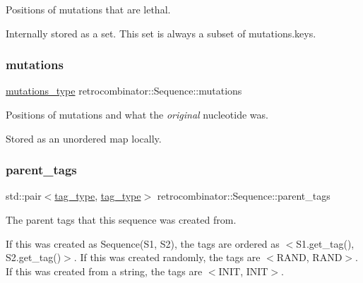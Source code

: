 Positions of mutations that are lethal. 

Internally stored as a set. This set is always a subset of {\ttfamily mutations.\+keys}. \mbox{\label{classretrocombinator_1_1Sequence_a07dd3101f7838d76300313ecfb97f3fc}} 
\subsubsection{\texorpdfstring{mutations}{mutations}}
{\footnotesize\ttfamily \hyperlink{classretrocombinator_1_1Sequence_a2abbaf2376f035a997e02c4afae9f476}{mutations\+\_\+type} retrocombinator\+::\+Sequence\+::mutations\hspace{0.3cm}{\ttfamily [private]}}



Positions of mutations and what the {\itshape original} nucleotide was. 

Stored as an unordered map locally. \mbox{\label{classretrocombinator_1_1Sequence_a023fef0801bd63048bf5c7b2442694cc}} 
\subsubsection{\texorpdfstring{parent\+\_\+tags}{parent\_tags}}
{\footnotesize\ttfamily std\+::pair$<$\hyperlink{constants_8h_afd7c6eb4293e8c4d12827609a9a34b9b}{tag\+\_\+type}, \hyperlink{constants_8h_afd7c6eb4293e8c4d12827609a9a34b9b}{tag\+\_\+type}$>$ retrocombinator\+::\+Sequence\+::parent\+\_\+tags\hspace{0.3cm}{\ttfamily [private]}}



The parent tags that this sequence was created from. 

If this was created as Sequence(\+S1, S2), the tags are ordered as $<$S1.\+get\+\_\+tag(), S2.\+get\+\_\+tag()$>$. If this was created randomly, the tags are $<$R\+A\+ND, R\+A\+ND$>$. If this was created from a string, the tags are $<$I\+N\+IT, I\+N\+IT$>$. \mbox{\label{classretrocombinator_1_1Sequence_ae599e85a84a78e23d33f6c3085248726}} 
